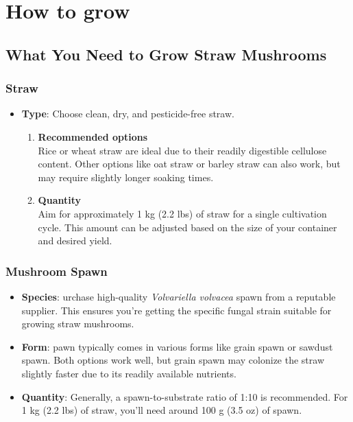 \chapter{How to grow}
\section{What You Need to Grow Straw Mushrooms}
\subsection{Straw}
\begin{itemize}
    \item \textbf{Type}: Choose clean, dry, and pesticide-free straw.
    \begin{enumerate}
        \item \textbf{Recommended options}\\ Rice or wheat straw are ideal due to their readily digestible cellulose content. Other options like oat straw or barley straw can also work, but may require slightly longer soaking times.
        \item \textbf{Quantity} \\ Aim for approximately 1 kg (2.2 lbs) of straw for a single cultivation cycle. This amount can be adjusted based on the size of your container and desired yield.
    \end{enumerate}
\end{itemize}
\subsection{Mushroom Spawn}
\begin{itemize}
    \item \textbf{Species}: urchase high-quality \textit{Volvariella volvacea} spawn from a reputable supplier. This ensures you're getting the specific fungal strain suitable for growing straw mushrooms.
    \item \textbf{Form}: pawn typically comes in various forms like grain spawn or sawdust spawn. Both options work well, but grain spawn may colonize the straw slightly faster due to its readily available nutrients.
    \item \textbf{Quantity}: Generally, a spawn-to-substrate ratio of 1:10 is recommended. For 1 kg (2.2 lbs) of straw, you'll need around 100 g (3.5 oz) of spawn.
\end{itemize}

